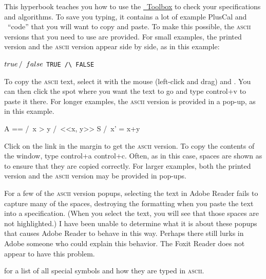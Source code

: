 \documentclass[fleqn,leqno]{article}
\begin{document}
This hyperbook teaches you how to use the
    \hyperref{http://research.microsoft.com/en-us/um/people/lamport/tla/toolbox.html}{}{}{\tlaplus\ Toolbox}
to check your specifications and algorithms.  To save you typing, it
contains a lot of example PlusCal and \tlaplus\ ``code'' that you will
want to copy and paste.  To make this possible, the \textsc{ascii}
versions that you need to use are provided.  For small examples, the
printed version and the \textsc{ascii} version appear side by side, as
in this example:
\begin{twocols}
$\TRUE \, /\ \, \FALSE$ \midcol \verb|TRUE /\ FALSE|
\end{twocols}
To copy the \textsc{ascii} text, select it with the mouse (left-click
and drag) and .  You
can then click the spot where you want the text to go and type
\textsf{control+v} to paste it there.  For longer examples, the
\textsc{ascii} version is provided in a pop-up, as in this example.
\begin{display}
\begin{notla}
A == /\ x > y
     /\ <<x, y>> \in S
     /\ x' = x+y
\end{notla}
\begin{tlatex}
%
%
\end{tlatex}
\end{display}
Click on the link in the margin to get the \textsc{ascii} version.  To
copy the contents of the window, type 
 \textsf{control+a} \textsf{control+c}\@.  
Often, as in this case, spaces are shown as \verb*| | to
ensure that they are copied correctly.  
%
For larger examples, both the printed version and the \textsc{ascii}
version may be provided in pop-ups.  

For a few of the \textsc{ascii} version popups, selecting the text in
Adobe Reader fails to capture many of the spaces, destroying the
formatting when you paste the text into a specification.  (When you
select the text, you will see that those spaces are not highlighted.)
I have been unable to determine what it is about these popups that
causes Adobe Reader to behave in this way.  Perhaps there still lurks
in Adobe someone who could explain this behavior.  The Foxit Reader
does not appear to have this problem.

for a list of all special
symbols and how they are typed in \textsc{ascii}.  
\end{document}

